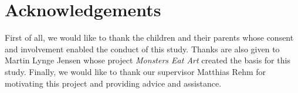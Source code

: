 \section{Acknowledgements}
First of all, we would like to thank the children and their parents whose consent and involvement enabled the conduct of this study. Thanks are also given to Martin Lynge Jensen whose project \textit{Monsters Eat Art} created the basis for this study. Finally, we would like to thank our supervisor Matthias Rehm for motivating this project and providing advice and assistance. 
